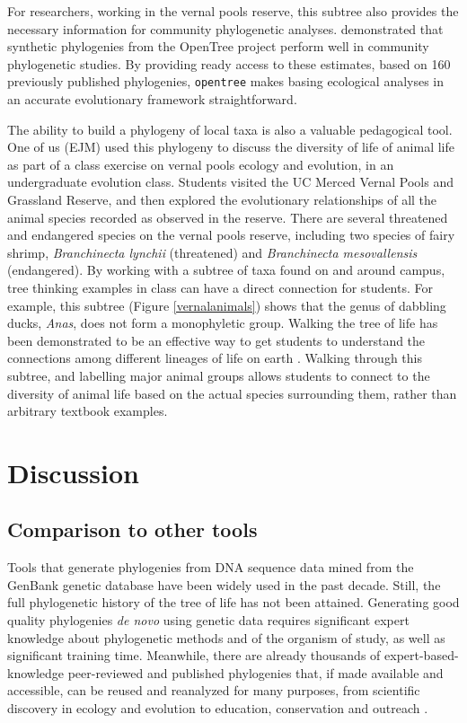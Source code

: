 \documentclass[oupdraft]{sysbio_sse}
\begin{document}
For researchers, working in the vernal pools reserve, this subtree also provides the necessary information for community phylogenetic analyses. \citet{li_for_2019} demonstrated that synthetic phylogenies from the OpenTree project perform well in community phylogenetic studies. By providing ready access to these estimates, based on 160 previously published phylogenies, \texttt{opentree} makes basing ecological analyses in an accurate evolutionary framework straightforward.


The ability to build a phylogeny of local taxa is also a valuable pedagogical tool. One of us (EJM) used this phylogeny to discuss the diversity of life of animal life as part of a class exercise on vernal pools ecology and evolution, in an undergraduate evolution class.
Students visited the UC Merced Vernal Pools and Grassland Reserve, and then explored the evolutionary relationships of all the animal species recorded as observed in the reserve.
There are several threatened and endangered species on the vernal pools reserve, including two species of fairy shrimp, \textit{Branchinecta lynchii} (threatened) and \textit{Branchinecta mesovallensis} (endangered).
By working with a subtree of taxa found on and around campus, tree thinking examples in class can have a direct connection for students. For example, this subtree (Figure \ref{vernalanimals}) shows that the genus of dabbling ducks, \textit{Anas}, does not form a monophyletic group. Walking the tree of life has been demonstrated to be an effective way to get students to understand the connections among different lineages of life on earth \citep{ballen_walking_2017}. Walking through this subtree, and labelling major animal groups allows students to connect to the diversity of animal life based on the actual species surrounding them, rather than arbitrary textbook examples.

\bigskip
\section{Discussion}
\label{sec5}

\subsection{Comparison to other tools}

Tools that generate phylogenies from DNA sequence data mined from the GenBank genetic
database \citep{smith2009mega, sanderson2008phylota, antonelli2014supersmart}
have been widely used in the past decade. Still, the full phylogenetic history of the
tree of life has not been attained.
Generating good quality phylogenies \textit{de novo} using genetic data requires
significant expert knowledge about phylogenetic methods and of
the organism of study, as well as significant training time. Meanwhile, there are
already thousands of expert-based-knowledge peer-reviewed and published phylogenies
that, if made available and accessible, can be reused and reanalyzed for many purposes,
from scientific discovery in ecology and evolution to education, conservation and
outreach \citep{stoltzfus2013phylotastic, mctavish_phylesystem_2015, li2019common}.
\end{document}
